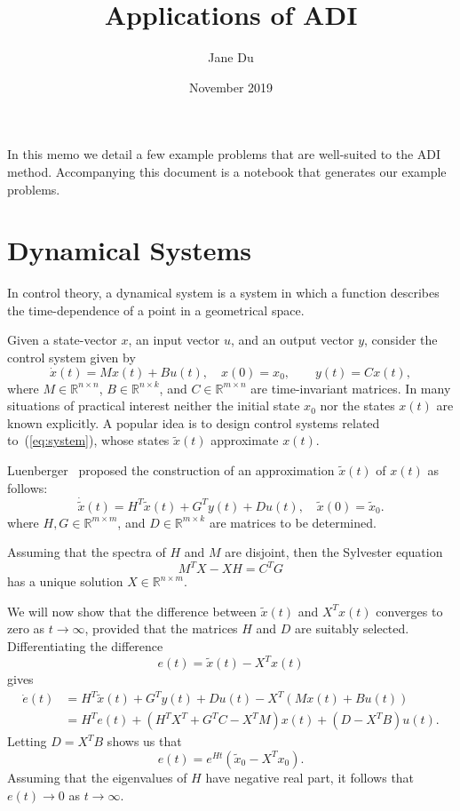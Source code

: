\documentclass{article}
\title{Applications of ADI}
\author{Jane Du}
\date{November 2019}
\begin{document}
\maketitle

In this memo we detail a few example problems that are well-suited to the ADI method. Accompanying this document is a \href{https://github.com/janezdu/adi/blob/master/notebooks/Applications\%20of\%20ADI.ipynb}{}{notebook} that generates our example problems.

\section{Dynamical Systems}
In control theory, a dynamical system is a system in which a function describes the time-dependence of a point in a geometrical space. 

Given a state-vector $x$, an input vector $u$, and an output vector $y$, consider the control system given by 
\begin{equation} 
\dot{x}(t) = M x(t)+B u(t), \quad x(0)=x_0,\qquad 
y(t) = C x(t),
\label{eq:system} 
\end{equation} 
where $M\in\mathbb{R}^{n\times n}$, $B\in\mathbb{R}^{n\times k}$, and $C\in\mathbb{R}^{m\times n}$ are time-invariant matrices. In many situations of practical interest neither the initial state $x_0$ nor the states $x(t)$ are known explicitly. A popular idea is to design control systems related to~(\ref{eq:system}), whose states $\tilde{x}(t)$ approximate $x(t)$. 

Luenberger~\cite{} proposed the construction of an approximation $\tilde{x}(t)$ of $x(t)$ as follows:
\[
\dot{\tilde{x}}(t)=H^T\tilde{x}(t)+G^T y(t)+Du(t), \quad \tilde{x}(0) = \tilde{x}_0.
\]
where $H,G\in\mathbb{R}^{m\times m}$, and $D\in\mathbb{R}^{m\times k}$ are matrices to be determined. 

Assuming that the spectra of $H$ and $M$ are disjoint, then the Sylvester equation 
\[
M^TX - XH = C^TG
\]
has a unique solution $X\in\mathbb{R}^{n\times m}$. 

We will now show that the difference between $\tilde{x}(t)$ and $X^Tx(t)$ converges to zero as $t\rightarrow \infty$, provided that the matrices $H$ and $D$ are suitably selected. Differentiating the difference 
\[
e(t) = \tilde{x}(t) - X^Tx(t)
\]
gives 
\[
\begin{split}
\dot{e}(t) &= H^T\tilde{x}(t) + G^Ty(t) + Du(t) - X^T(Mx(t)+Bu(t))\\
&= H^Te(t) + (H^TX^T+G^TC-X^TM)x(t) + (D-X^TB)u(t). 
\end{split}
\]
Letting $D = X^TB$ shows us that 
\[
e(t) = e^{Ht}(\tilde{x}_0-X^Tx_0).
\]
Assuming that the eigenvalues of $H$ have negative real part, it follows that $e(t)\rightarrow 0$ as $t\rightarrow \infty$. 
\end{document}
